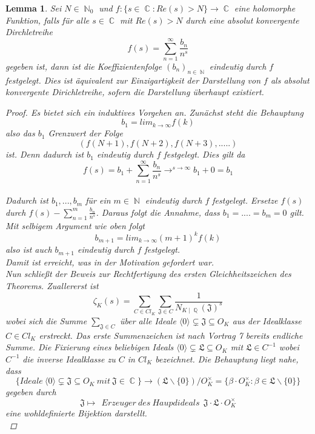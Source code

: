 \documentclass[10pt,a4paper]{article}
\theoremstyle{plain}
\newtheorem{lem}[thm]{Lemma}
\theoremstyle{definition}
\theoremstyle{remark}
\DeclareMathOperator{\C}{\mathbb{C}}
\DeclareMathOperator{\Q}{\mathbb{Q}}
\DeclareMathOperator{\N}{\mathbb{N}}
\begin{document}
 \begin{lem}
 
 \textit{Sei $N \in \N_0$ und $f \colon \{s \in \C \colon Re(s)>N\}\rightarrow \C$ eine holomorphe Funktion, falls für alle $s \in \C$ mit $Re(s) >N$ durch eine absolut konvergente Dirchletreihe $$f(s) = \sum_{n=1}^{\infty}\frac{b_n}{n^s}$$gegeben ist, dann ist die Koeffizientenfolge $(b_n)_{n \in \N}$ eindeutig durch $f$ festgelegt. Dies ist äquivalent zur Einzigartigkeit der Darstellung von $f$ als absolut konvergente Dirichletreihe, sofern die Darstellung überhaupt existiert.}
 \\
\begin{proof}
 Es bietet sich ein induktives Vorgehen an.
Zunächst steht die Behauptung $$b_1= lim_{k \to \infty} f(k)$$also das $b_1$ Grenzwert der Folge $$(f(N+1),f(N+2),f(N+3),.....)$$ ist. Denn dadurch ist $b_1$ eindeutig durch $f$ festgelegt. Dies gilt da $$f(s)=b_1+\sum_{n=1}^{\infty} \frac{b_n}{n^s}\rightarrow^{s \to \infty} b_1 + 0 = b_1$$
\\ 
Dadurch ist $b_1,...,b_m$ für ein $m \in \N$ eindeutig durch $f$ festgelegt. Ersetze $f(s)$ durch $f(s)-\sum_{n=1}^{m}\frac{b_n}{n^s}$. Daraus folgt die Annahme, dass $b_1=....=b_m=0$ gilt. Mit selbigem Argument wie oben folgt $$b_{m+1}=lim_{k\to \infty}(m+1)^k f(k)$$ also ist auch $b_{m+1}$ eindeutig durch $f$ festgelegt.
\\
Damit ist erreicht, was in der Motivation gefordert war.
\\
Nun schließt der \textit{Beweis} zur Rechtfertigung des ersten Gleichheitszeichen des Theorems. Zuallererst ist $$\zeta_K(s) = \sum_{C \in Cl_K}\sum_{\mathfrak{J} \in C}\frac{1}{N_{K\mid \Q}(\mathfrak{J})^s}$$wobei sich die Summe $\sum_{\mathfrak{J} \in C}$ über alle Ideale $\langle 0 \rangle \subsetneq \mathfrak{J} \subseteq O_K$ aus der Idealklasse $C \in Cl_K$ erstreckt. Das erste Summenzeichen ist nach Vortrag 7 bereits endliche Summe. Die Fixierung eines beliebigen Ideals $\langle 0 \rangle \subsetneq \mathfrak{L} \subseteq O_K$ mit $\mathfrak{L}\in C^{-1}$ wobei $C^{-1}$ die inverse Idealklasse zu $C$ in $Cl_K$ bezeichnet. Die Behauptung liegt nahe, dass  $$\{Ideale \ \langle 0 \rangle \subsetneq \mathfrak{J} \subseteq O_K \ mit \ \mathfrak{J} \in \C\}\rightarrow(\mathfrak{L}\backslash\{0\})/O_K^{\times}=\{ \beta \cdot O_K^{\times} \colon \beta \in \mathfrak{L}\backslash\{ 0\}\}$$ gegeben durch $$\mathfrak{J}\mapsto \ \ Erzeuger\ des\ Haupdideals \ \ \mathfrak{J\cdot L}\cdot O_K^{\times}$$ eine wohldefinierte Bijektion darstellt. \\

\end{proof}
\end{lem}
\end{document}
